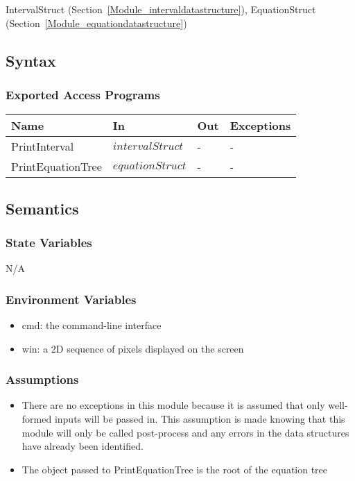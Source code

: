 \documentclass[12pt, titlepage]{article}
\begin{document}
IntervalStruct (Section~\ref{Module_intervaldatastructure}), EquationStruct 
(Section~\ref{Module_equationdatastructure})

\subsection{Syntax}

\subsubsection{Exported Access Programs}

\begin{center}
	\begin{tabular}{p{3.1cm} p{3cm} p{3cm} p{5cm}}
		\hline
		\textbf{Name} & \textbf{In} & \textbf{Out} & \textbf{Exceptions} \\
		\hline
		PrintInterval & $intervalStruct$ & - & - \\
		PrintEquationTree & $equationStruct$ & - & - \\
		\hline
	\end{tabular}
\end{center}

\subsection{Semantics}

\subsubsection{State Variables}

N/A

\subsubsection{Environment Variables}

\begin{itemize}
	\item cmd: the command-line interface
	\item win: a 2D sequence of pixels displayed on the screen
\end{itemize}

\subsubsection{Assumptions}

\begin{itemize}
	\item There are no exceptions in this module because it is assumed that 
	only well-formed inputs will be passed in. This assumption is made knowing 
	that this module will only be called post-process and any errors in the 
	data structures have already been identified.
	\item The object passed to PrintEquationTree is the root of the equation 
	tree
\end{itemize}
\end{document}
